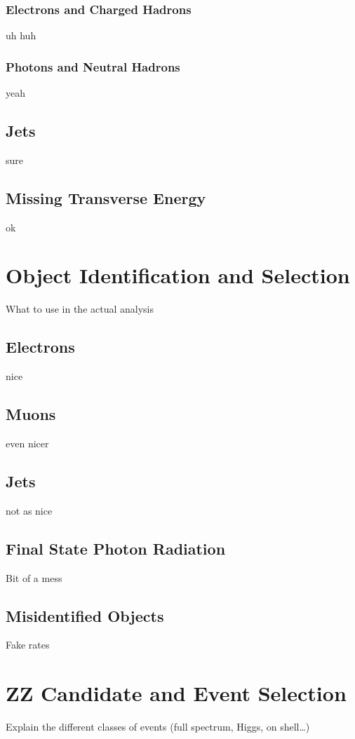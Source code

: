 \subsubsection{Electrons and Charged Hadrons}
uh huh

\subsubsection{Photons and Neutral Hadrons}
yeah


\subsection{Jets}
sure


\subsection{Missing Transverse Energy}
ok



\section{Object Identification and Selection}
What to use in the actual analysis

\subsection{Electrons}
nice


\subsection{Muons}
even nicer


\subsection{Jets}
not as nice


\subsection{Final State Photon Radiation}
Bit of a mess


\subsection{Misidentified Objects}\label{sec:looseID}
Fake rates



\section{ZZ Candidate and Event Selection}
Explain the different classes of events (full spectrum, Higgs, on shell\ldots)

